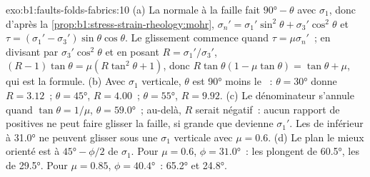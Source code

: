 \begin{solution}{exo:b1:faults-folds-fabrics:10}
(a) La normale à la faille fait $\ang{90} - \theta$ avec $\sigma_1$, donc d'après la
\cref{prop:b1:stress-strain-rheology:mohr},
$\sigma_n' = \sigma_1'\sin^2\theta + \sigma_3'\cos^2\theta$ et
$\tau = (\sigma_1' - \sigma_3')\sin\theta\cos\theta$. Le glissement commence quand
$\tau = \mu\sigma_n'$~; en divisant par $\sigma_3'\cos^2\theta$ et en posant
$R = \sigma_1'/\sigma_3'$, $(R - 1)\tan\theta = \mu(R\tan^2\theta + 1)$, donc
$R\tan\theta(1 - \mu\tan\theta) = \tan\theta + \mu$, qui est la formule.
(b) Avec $\sigma_1$ verticale, $\theta$ est \ang{90} moins le ~:
$\theta = \ang{30}$ donne $R = 3.12$~; $\theta = \ang{45}$, $R = 4.00$~;
$\theta = \ang{55}$, $R = 9.92$. (c) Le dénominateur s'annule quand
$\tan\theta = 1/\mu$, $\theta = \ang{59.0}$~; au-delà, $R$ serait négatif~:
aucun rapport de  positives ne peut faire glisser la faille, si grande que devienne
$\sigma_1'$. Les  de  inférieur à \ang{31.0} ne peuvent glisser
sous une $\sigma_1$ verticale avec $\mu = 0.6$. (d) Le plan le mieux orienté est à
$\ang{45} - \phi/2$ de $\sigma_1$. Pour $\mu = 0.6$, $\phi = \ang{31.0}$~:
les  plongent de \ang{60.5}, les  de \ang{29.5}. Pour $\mu = 0.85$,
$\phi = \ang{40.4}$~: \ang{65.2} et \ang{24.8}.
\end{solution}

